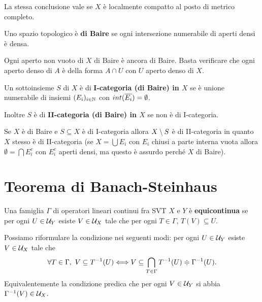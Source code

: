 \begin{exercise}
La stessa conclusione vale se $X$ \`e localmente compatto al posto di metrico completo.
\end{exercise}

\begin{definition}
Uno spazio topologico \`e \textbf{di Baire} se ogni intersezione numerabile di aperti densi \`e densa.
\end{definition}

\begin{remark}
Ogni aperto non vuoto di $X$ di Baire \`e ancora di Baire. Basta verificare che ogni aperto denso di $A$ \`e della forma $A\cap U$ con $U$ aperto denso di $X$.
\end{remark}


\begin{definition}
Un sottoinsieme $S$ di $X$ \`e di \textbf{I-categoria (di Baire) in $X$} se \`e unione numerabile di insiemi $(E_i)_{i\in\mathbb{N}}$ con $int(\overline{E_i})=\emptyset$.

Inoltre $S$ \`e di \textbf{II-categoria (di Baire) in $X$} se non \`e di I-categoria.
\end{definition}

\begin{remark}
Se $X$ \`e di Baire e $S\subseteq X$ \`e di I-categoria allora $X\setminus S$ \`e di II-categoria in quanto $X$ stesso \`e di II-categoria (se $X=\bigcup E_i$ con $E_i$ chiusi a parte interna vuota allora $\emptyset=\bigcap E_i^c$ con $E_i^c$ aperti densi, ma questo \`e assurdo perch\'e $X$ di Baire).
\end{remark}

\section{Teorema di Banach-Steinhaus}

\begin{definition}
Una famiglia $\Gamma$ di operatori lineari continui fra SVT $X$ e $Y$ \`e \textbf{equicontinua} se per ogni $U\in\mathcal{U}_Y$ esiste $V\in \mathcal{U}_X$ tale che per ogni $T\in\Gamma$, $T(V)\subseteq U$.
\end{definition}

\begin{remark}
Possiamo riformulare la condizione nei seguenti modi: per ogni $U\in\mathcal{U}_Y$ esiste $V\in\mathcal{U}_X$ tale che
\[\forall T\in\Gamma,\ V\subseteq T^{-1}(U)\Longleftrightarrow V\subseteq \bigcap_{T\in \Gamma}T^{-1}(U)\doteqdot \Gamma^{-1}(U).\]
Equivalentemente la condizione predica che per ogni $V\in\mathcal{U}_Y$ si abbia $\Gamma^{-1}(V)\in\mathcal{U}_X$.
\end{remark}

